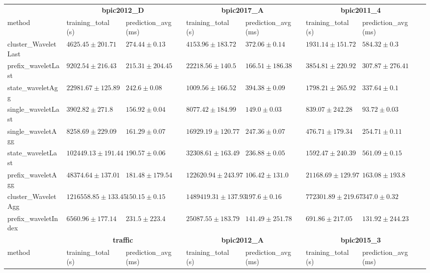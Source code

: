 \begin{table}[!htbp]
{\begin{tabular}{llllllll}
			\bottomrule
			\toprule
			& \multicolumn{2}{c}{{\bfseries bpic2012\_D}} & \multicolumn{2}{c}{{\bfseries bpic2017\_A}} & \multicolumn{2}{c}{{\bfseries bpic2011\_4}} \\ \cmidrule(lr){2-3} \cmidrule(lr){4-5} \cmidrule(lr){6-7}
			method  & training\_total (s) & prediction\_avg (ms) & training\_total (s) & prediction\_avg (ms) & training\_total (s) & prediction\_avg (ms) \\ \midrule
			cluster\_WaveletLast & $4625.45 \pm 201.71$ & $274.44 \pm 0.13$ & $4153.96 \pm 183.72$ & $372.06 \pm 0.14$ & $1931.14 \pm 151.72$ & $584.32 \pm 0.3$ \\ 
			prefix\_waveletLast & $9202.54 \pm 216.43$ & $215.31 \pm 204.45$ & $22218.56 \pm 140.5$ & $166.51 \pm 186.38$ & $3854.81 \pm 220.92$ & $307.87 \pm 276.41$ \\ 
			state\_waveletAgg & $22981.67 \pm 125.89$ & $242.6 \pm 0.08$ & $\mathbf{1009.56 \pm 166.52}$ & $394.38 \pm 0.09$ & $1798.21 \pm 265.92$ & $337.64 \pm 0.1$ \\ 
			single\_waveletLast & $\mathbf{3902.82 \pm 271.8}$ & $156.92 \pm 0.04$ & $8077.42 \pm 184.99$ & $149.0 \pm 0.03$ & $839.07 \pm 242.28$ & $\mathbf{93.72 \pm 0.03}$ \\ 
			single\_waveletAgg & $8258.69 \pm 229.09$ & $161.29 \pm 0.07$ & $16929.19 \pm 120.77$ & $247.36 \pm 0.07$ & $\mathbf{476.71 \pm 179.34}$ & $254.71 \pm 0.11$ \\ 
			state\_waveletLast & $102449.13 \pm 191.44$ & $190.57 \pm 0.06$ & $32308.61 \pm 163.49$ & $236.88 \pm 0.05$ & $1592.47 \pm 240.39$ & $561.09 \pm 0.15$ \\ 
			prefix\_waveletAgg & $48374.64 \pm 137.01$ & $181.48 \pm 179.54$ & $122620.94 \pm 243.97$ & $\mathbf{106.42 \pm 131.0}$ & $21168.69 \pm 129.97$ & $163.08 \pm 193.8$ \\ 
			cluster\_WaveletAgg & $1216558.85 \pm 133.45$ & $\mathbf{150.15 \pm 0.15}$ & $1489419.31 \pm 137.93$ & $197.6 \pm 0.16$ & $772301.89 \pm 219.67$ & $347.0 \pm 0.32$ \\ 
			prefix\_waveletIndex & $6560.96 \pm 177.14$ & $231.5 \pm 223.4$ & $25087.55 \pm 183.79$ & $141.49 \pm 251.78$ & $691.86 \pm 217.05$ & $131.92 \pm 244.23$ \\ 
			\bottomrule
			\toprule
			& \multicolumn{2}{c}{{\bfseries traffic}} & \multicolumn{2}{c}{{\bfseries bpic2012\_A}} & \multicolumn{2}{c}{{\bfseries bpic2015\_3}} \\ \cmidrule(lr){2-3} \cmidrule(lr){4-5} \cmidrule(lr){6-7}
			method  & training\_total (s) & prediction\_avg (ms) & training\_total (s) & prediction\_avg (ms) & training\_total (s) & prediction\_avg (ms) \\ \midrule

\end{tabular}}
\end{table}
